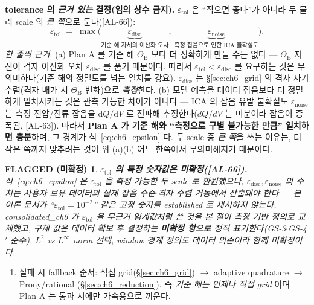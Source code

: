 \documentclass[11pt,a4paper]{article}
\newtheorem*{flagbox}{FLAGGED (미확정)}
\newcommand{\dd}{\mathrm{d}}
\newcommand{\tol}{\mathrm{tol}}
\newcommand{\noise}{\mathrm{noise}}
\newcommand{\AL}[1]{\textsf{[AL-#1]}}
\begin{document}
\textbf{tolerance 의 \emph{근거 있는} 결정(임의 상수 금지).} $\varepsilon_\tol$ 은 ``작으면 좋다''가 아니라 두 물리
scale 의 \emph{큰 쪽}으로 둔다(\AL{66}):
\begin{equation}
\varepsilon_\tol\;=\;\max\!\Big(\underbrace{\varepsilon_{\mathrm{disc}}}_{\text{기준 해 자체의 이산화 오차}},\
\underbrace{\varepsilon_\noise}_{\text{측정 잡음으로 인한 ICA 불확실도}}\Big).
\label{eq:ch6_epsilon}
\end{equation}
\emph{한 줄씩 근거}: (a) Plan A 를 기준 해 $\Theta_{\mathrm B}$ 보다 더 정확하게 만들 수는 없다 — $\Theta_{\mathrm B}$
자신이 격자 이산화 오차 $\varepsilon_{\mathrm{disc}}$ 를 품기 때문이다. 따라서 $\varepsilon_\tol<\varepsilon_{\mathrm{disc}}$
를 요구하는 것은 무의미하다(기준 해의 정밀도를 넘는 일치를 강요). $\varepsilon_{\mathrm{disc}}$ 는 \S\ref{sec:ch6_grid}
의 격자 자기수렴(격자 배가 시 $\Theta_{\mathrm B}$ 변화)으로 \emph{측정}한다. (b) 모델 예측을 데이터 잡음보다 더
정밀하게 일치시키는 것은 관측 가능한 차이가 아니다 — ICA 의 잡음 유발 불확실도 $\varepsilon_\noise$ 는 측정
전압/전류 잡음을 $\dd Q/\dd V$ 로 전파해 추정한다($dQ/dV$ 는 미분이라 잡음이 증폭됨, \cite{dubarry2022,fly2020}
\AL{63}). 따라서 \textbf{Plan A 가 기준 해와 ``측정으로 구별 불가능한 만큼'' 일치하면 충분}하며, 그 경계가
식~\eqref{eq:ch6_epsilon} 다. 두 scale 중 \emph{큰 쪽}을 쓰는 이유는, 더 작은 쪽까지 맞추려는 것이 위 (a)(b)
어느 한쪽에서 무의미해지기 때문이다.
\begin{flagbox}
\textbf{$\varepsilon_\tol$ 의 \emph{특정 숫자값}은 미확정(\AL{66}).} 식~\eqref{eq:ch6_epsilon} 은 $\varepsilon_\tol$
을 \emph{측정 가능한 두 scale} 로 환원했으나, $\varepsilon_{\mathrm{disc}},\varepsilon_\noise$ 의 \emph{수치}는
사용자 보유 데이터의 실제 잡음 수준$\cdot$격자 수렴 거동에서 산출돼야 한다 — 본 이론 문서가 ``$\varepsilon_\tol=10^{-2}$''
같은 \emph{고정 숫자}를 established 로 제시하지 않는다. consolidated\_ch6 가 $\varepsilon_\tol$ 을 무근거 임계값처럼
쓴 것을 본 절이 \emph{측정 기반 정의}로 교체했고, 구체 값은 데이터 확보 후 결정하는 \textbf{미확정 항}으로 정직
표기한다(GS-3$\cdot$GS-4$'$ 준수). $L^2$ vs $L^\infty$ norm 선택, window 경계 정의도 데이터 의존이라 함께 미확정이다.
\end{flagbox}
\begin{enumerate}[label=F\arabic*),leftmargin=2.4em,start=6]
\item 실패 시 fallback 순서: 직접 grid(\S\ref{sec:ch6_grid}) $\to$ adaptive quadrature $\to$ Prony/rational
  (\S\ref{sec:ch6_reduction}). 즉 \emph{기준 해는 언제나 직접 grid} 이며 Plan A 는 통과 시에만 가속용으로 끼운다.
\end{enumerate}
\end{document}
